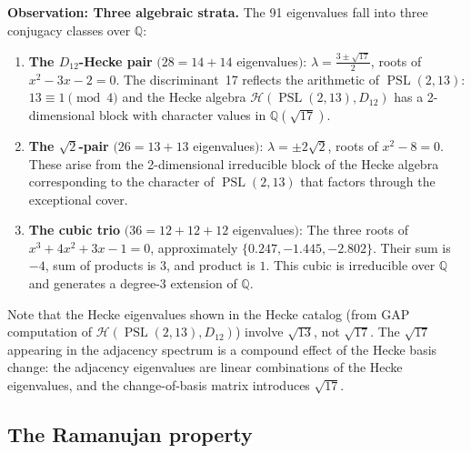 \documentclass[11pt,a4paper]{article}
\theoremstyle{plain}
\theoremstyle{definition}
\newcommand{\PSL}{\operatorname{PSL}}
\begin{document}
\begin{tcolorbox}[breakable, colback=yellow!12, colframe=yellow!12,
  boxrule=0pt, sharp corners]
\textbf{Observation: Three algebraic strata.}
The 91 eigenvalues fall into three conjugacy classes over $\mathbb{Q}$:

\begin{enumerate}
\item \textbf{The $D_{12}$-Hecke pair} $(28 = 14+14$ eigenvalues$)$:
  $\lambda = \frac{3 \pm \sqrt{17}}{2}$, roots of $x^2 - 3x - 2 = 0$.
  The discriminant~17 reflects the arithmetic of $\PSL(2,13)$: $13 \equiv 1 \pmod{4}$
  and the Hecke algebra $\mathcal{H}(\PSL(2,13), D_{12})$ has a 2-dimensional block
  with character values in $\mathbb{Q}(\sqrt{17})$.

\item \textbf{The $\sqrt{2}$-pair} $(26 = 13+13$ eigenvalues$)$:
  $\lambda = \pm 2\sqrt{2}$, roots of $x^2 - 8 = 0$.
  These arise from the 2-dimensional irreducible block of the Hecke algebra
  corresponding to the character of $\PSL(2,13)$ that factors through the
  exceptional cover.

\item \textbf{The cubic trio} $(36 = 12+12+12$ eigenvalues$)$:
  The three roots of $x^3 + 4x^2 + 3x - 1 = 0$, approximately
  $\{0.247, -1.445, -2.802\}$.
  Their sum is $-4$, sum of products is $3$, and product is $1$.
  This cubic is irreducible over $\mathbb{Q}$ and generates a degree-3 extension
  of $\mathbb{Q}$.
\end{enumerate}

Note that the Hecke eigenvalues shown in the Hecke catalog (from GAP computation
of $\mathcal{H}(\PSL(2,13), D_{12})$) involve $\sqrt{13}$, not $\sqrt{17}$.
The $\sqrt{17}$ appearing in the adjacency spectrum is a compound effect of the
Hecke basis change: the adjacency eigenvalues are linear combinations of the
Hecke eigenvalues, and the change-of-basis matrix introduces $\sqrt{17}$.
\end{tcolorbox}

\subsection{The Ramanujan property}
\end{document}
